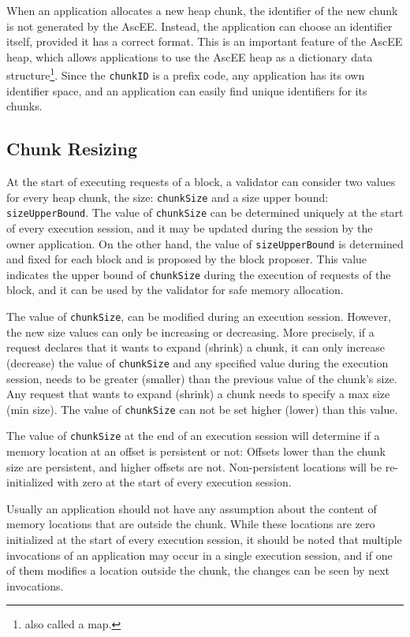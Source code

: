 When an application allocates a new heap chunk, the identifier of the new chunk is not generated by
the AscEE. Instead, the application can choose an identifier itself, provided it has a correct format. This
is an important feature of the AscEE heap, which allows applications to use the AscEE heap as a dictionary
data structure\footnote{also called a map.}.
Since the \texttt{chunkID} is a prefix code, any application has its own identifier space, and an application
can easily find unique identifiers for its chunks.

\subsection{Chunk Resizing}\label{subsec:ch-resize}

At the start of executing requests of a block, a validator can consider two values for every
heap chunk, the size: \texttt{chunkSize} and a size upper bound: \texttt{sizeUpperBound}. The value of
\texttt{chunkSize} can be determined uniquely at the start of
every execution session, and it may be updated during the session by the owner application. On the other hand,
the value of \texttt{sizeUpperBound} is determined and fixed for each block and is proposed by the block
proposer. This value indicates the upper bound of \texttt{chunkSize} during the execution of
requests of the block, and it can be used by the validator for safe memory allocation.

The value of \texttt{chunkSize}, can be modified during an execution session. However, the new size values can only be
increasing or decreasing. More precisely, if a request declares that it wants to expand (shrink) a chunk, it can only
increase (decrease) the value of \texttt{chunkSize} and any specified value during the execution
session, needs to be greater (smaller) than the previous value of the chunk's size. Any request that wants to expand
(shrink) a chunk needs to specify a max size (min size). The value of \texttt{chunkSize} can not be set higher
(lower) than this value.

The value of \texttt{chunkSize} at the end of an execution session will determine if a memory location at an
offset is persistent or not: Offsets lower than the chunk size are persistent, and higher offsets are not.
Non-persistent locations will be re-initialized with zero at the start of every execution session.

Usually an application should not have any assumption about the content of memory locations that are outside the chunk.
While these locations are zero initialized at the start of every execution session, it should be noted that multiple
invocations of an application may occur in a single execution session, and if one of them modifies a location outside
the chunk, the changes can be seen by next invocations.

